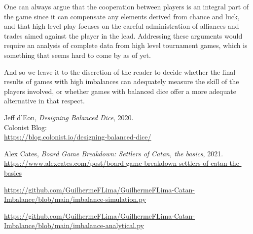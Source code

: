 \documentclass[11pt]{article}
\begin{document}
One can always argue that the cooperation between players is an integral part of the game since it can compensate any elements derived from chance and luck, and that high level play focuses on the careful administration of alliances and trades aimed against the player in the lead. Addressing these arguments would require an analysis of complete data from high level tournament games, which is something that seems hard to come by as of yet. 

And so we leave it to the discretion of the reader to decide whether the final results of games with high imbalances can adequately measure the skill of the players involved, or whether games with balanced dice offer a more adequate alternative in that respect.

\pagebreak 

\begin{thebibliography}{9}

  Jeff d'Eon, \textit{Designing Balanced Dice}, 2020.\\
  Colonist Blog: \\
  \url{https://blog.colonist.io/designing-balanced-dice/}
 
 Alex Cates, \textit{Board Game Breakdown: Settlers of Catan, the basics}, 2021. \\
 \url{https://www.alexcates.com/post/board-game-breakdown-settlers-of-catan-the-basics}

\url{https://github.com/GuilhermeFLima/GuilhermeFLima-Catan-Imbalance/blob/main/imbalance-simulation.py}

\url{https://github.com/GuilhermeFLima/GuilhermeFLima-Catan-Imbalance/blob/main/imbalance-analytical.py}


\end{thebibliography}
\end{document}
